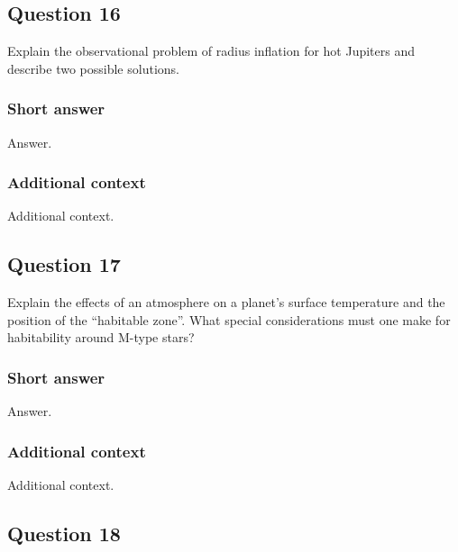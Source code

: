 \documentclass[a4paper,10pt]{article}
\begin{document}
\newpage
\subsection{Question 16}

Explain the observational problem of radius inflation for hot Jupiters and describe two possible solutions.

\subsubsection{Short answer}

Answer.

\subsubsection{Additional context}

Additional context.


\newpage
\subsection{Question 17}

Explain the effects of an atmosphere on a planet's surface temperature and the position of the “habitable zone”. What special considerations must one make for habitability around M-type stars?

\subsubsection{Short answer}

Answer.

\subsubsection{Additional context}

Additional context.


\newpage
\subsection{Question 18}
\end{document}
